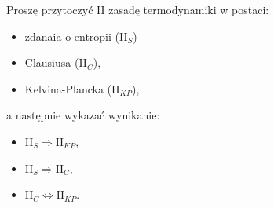 \documentclass[11pt,a4paper]{article}
\begin{document}
Proszę przytoczyć II zasadę termodynamiki w postaci:
\begin{itemize}
  \item zdanaia o entropii (II$_{S}$)
  \item Clausiusa (II$_{C}$),
  \item Kelvina-Plancka (II$_{KP}$),
\end{itemize}

a następnie wykazać wynikanie:
\begin{itemize}
  \item II$_{S} \Rightarrow \text{II}_{KP}$,
  \item II$_{S} \Rightarrow \text{II}_{C}$,
  \item II$_{C} \Leftrightarrow \text{II}_{KP}$.
\end{itemize}
\end{document}
